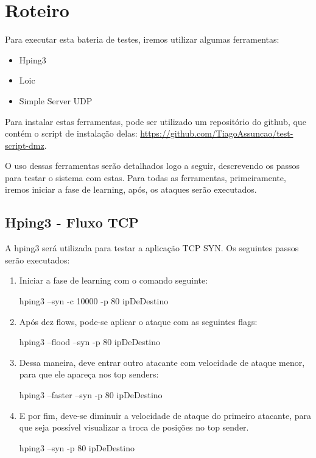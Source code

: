 \chapter[Roteiro]{Roteiro}

Para executar esta bateria de testes, iremos utilizar algumas ferramentas:

\begin{itemize}
    \item Hping3
    \item Loic
    \item Simple Server UDP
\end{itemize}

Para instalar estas ferramentas, pode ser utilizado um repositório do github,
que contém o script de instalação delas:
\hyperref[label_name]{https://github.com/TiagoAssuncao/test-script-dmz}.

O uso dessas ferramentas serão detalhados logo a seguir, descrevendo os passos para
testar o sistema com estas. Para todas as ferramentas, primeiramente, iremos
iniciar a fase de learning, após, os ataques serão executados.

\section{Hping3 - Fluxo TCP}
\label{sec:Hping3 - Fluxo TCP}
A hping3 será utilizada para testar a aplicação TCP SYN. Os seguintes passos
serão executados:

\begin{enumerate}
    \item Iniciar a fase de learning com o comando seguinte:

        hping3 --syn -c 10000 -p 80 ipDeDestino

    \item Após dez flows, pode-se aplicar o ataque com as seguintes flags:

        hping3 --flood --syn  -p 80 ipDeDestino

    \item Dessa maneira, deve entrar outro atacante com velocidade de ataque menor,
        para que ele apareça nos top senders:

        hping3 --faster --syn  -p 80 ipDeDestino

    \item E por fim, deve-se diminuir a velocidade de ataque do primeiro atacante,
        para que seja possível visualizar a troca de posições no top sender.

        hping3 --syn  -p 80 ipDeDestino
\end{enumerate}

